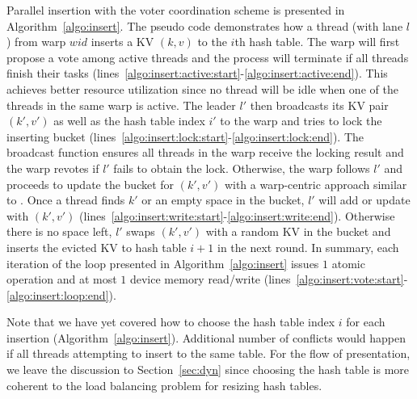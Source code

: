 Parallel insertion with the voter coordination scheme is presented in Algorithm~\ref{algo:insert}.
The pseudo code demonstrates how a thread (with lane $l$) from warp $wid$ inserts a KV $(k,v)$ to the $i$th hash table. 
The warp will first propose a vote among active threads and the process will terminate if all threads finish their tasks (lines~\ref{algo:insert:active:start}-\ref{algo:insert:active:end}).  
This achieves better resource utilization since no thread will be idle when one of the threads in the same warp is active.  
The leader $l'$ then broadcasts its KV pair $(k',v')$ as well as the hash table index $i'$ to the warp and tries to lock the inserting bucket (lines~\ref{algo:insert:lock:start}-\ref{algo:insert:lock:end}). 
The broadcast function ensures all threads in the warp receive the locking result and the warp revotes if $l'$ fails to obtain the lock.
Otherwise, the warp follows $l'$ and proceeds to update the bucket for $(k',v')$ with a warp-centric approach similar to .
Once a thread finds $k'$ or an empty space in the bucket, $l'$ will add or update with $(k',v')$ (lines~\ref{algo:insert:write:start}-\ref{algo:insert:write:end}).
Otherwise there is no space left, $l'$ swaps $(k',v')$ with a random KV in the bucket and inserts the evicted KV to hash table $i+1$ in the next round. 
In summary, each iteration of the loop presented in Algorithm~\ref{algo:insert} issues $1$ atomic operation and at most $1$ device memory read/write (lines~\ref{algo:insert:vote:start}-\ref{algo:insert:loop:end}).  

Note that we have yet covered how to choose the hash table index $i$ for each insertion (Algorithm~\ref{algo:insert}). Additional number of conflicts would happen if all threads attempting to insert to the same table. For the flow of presentation, we leave the discussion to Section~\ref{sec:dyn} since choosing the hash table is more coherent to the load balancing problem for resizing hash tables. 


